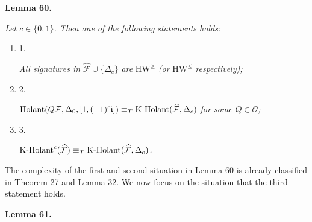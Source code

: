 

\par\medskip\noindent\textbf{
\textbf{Lemma 60}\textbf{.}
}\par



\emph{Let $c\in\{0,1\}$. Then one of the following statements holds:}\par


\begin{enumerate}


\item[] 
1. 


\emph{All signatures in }$\widehat{\mathcal{F}}\cup\{\Delta_{c}\}$\emph{ are }$\text{HW}^{\geq}$\emph{ (or }$\text{HW}^{\leq}$\emph{ respectively);}\par





\item[] 
2. 


$\textup{{Holant}}(Q\mathcal{F},\Delta_{0},[1,(-1)^{c}\mathfrak{i}])\equiv_{T}\textup{{K-Holant}}(\widehat{\mathcal{F}},\Delta_{c})$\emph{ for some }$Q\in\mathscr{O}$\emph{;}\par





\item[] 
3. 


$\textup{{K-Holant}}^{c}(\widehat{\mathcal{F}})\equiv_{T}\textup{{K-Holant}}(\widehat{\mathcal{F}},\Delta_{c})$\emph{.}\par





\end{enumerate}






The complexity of the first and second situation in Lemma 60 is already classified in Theorem 27 and Lemma 32. We now focus on the situation that the third statement holds.\par





\par\medskip\noindent\textbf{
\textbf{Lemma 61}\textbf{.}
}\par



